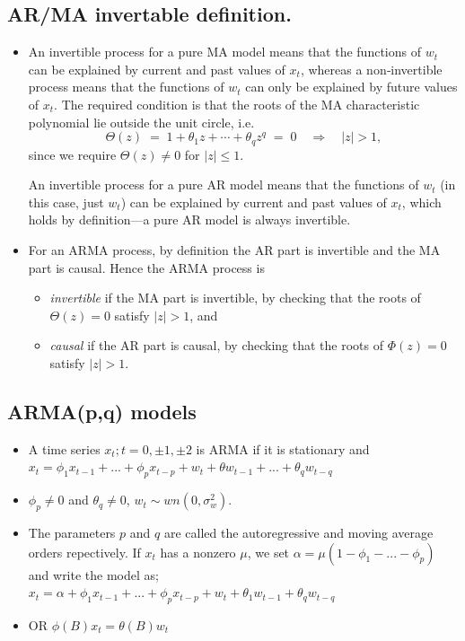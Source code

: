 \documentclass{article}
\begin{document}
\subsection{AR/MA invertable definition.}
\begin{itemize}

  \item An invertible process for a pure MA model means that the functions of \(w_t\) can be explained by current and past values of \(x_t\), whereas a non‐invertible process means that the functions of \(w_t\) can only be explained by future values of \(x_t\).  The required condition is that the roots of the MA characteristic polynomial lie outside the unit circle, i.e.\
  \[
    \Theta(z) \;=\; 1 + \theta_1 z + \cdots + \theta_q z^q \;=\; 0
    \quad\Longrightarrow\quad |z| > 1,
  \]
  since we require \(\Theta(z)\neq0\) for \(|z|\le1\).

  An invertible process for a pure AR model means that the functions of \(w_t\) (in this case, just \(w_t\)) can be explained by current and past values of \(x_t\), which holds by definition—a pure AR model is always invertible.

  \item For an ARMA process, by definition the AR part is invertible and the MA part is causal.  Hence the ARMA process is
  \begin{itemize}
    \item \emph{invertible} if the MA part is invertible, by checking that the roots of \(\Theta(z)=0\) satisfy \(|z|>1\), and
    \item \emph{causal} if the AR part is causal, by checking that the roots of \(\Phi(z)=0\) satisfy \(|z|>1\).
  \end{itemize}
\end{itemize}


\subsection{ARMA(p,q) models}
\begin{itemize}
    \item A time series ${x_t ; t = 0, \pm 1, \pm 2}$ is ARMA if it is stationary and\\
    $x_t = \phi_1 x_{t-1} + ... + \phi_p x_{t-p} + w_t + \theta w_{t-1} + ... + \theta_q w_{t-q}$
    \item $\phi_p \neq 0$ and $\theta_q \neq 0$, $w_t \sim wn(0,\sigma^2_w)$.
    \item The parameters $p$ and $q$ are called the autoregressive and moving average orders repectively. If $x_t$ has a nonzero $\mu$, we set $\alpha = \mu( 1 - \phi_1 - ... - \phi_p)$ and write the model as;
    \subitem $x_t = \alpha + \phi_1 x_{t-1} + ... + \phi_p x_{t-p} + w_t + \theta_1 w_{t-1} + \theta_q w_{t-q}$
    \item OR $\phi(B) x_t = \theta(B)w_t$
\end{itemize}
\end{document}
